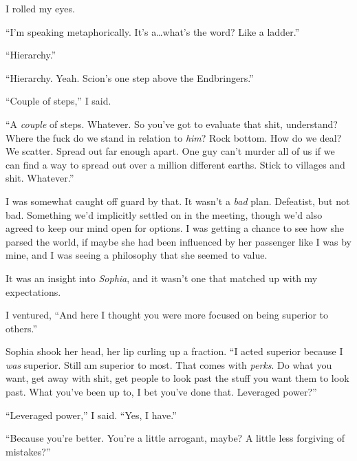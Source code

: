 I rolled my eyes.



``I'm speaking metaphorically.  It's a\ldots what's the word?  Like a ladder.''



``Hierarchy.''



``Hierarchy.  Yeah.  Scion's one step above the Endbringers.''



``Couple of steps,'' I said.



``A \emph{couple} of steps.  Whatever.  So you've got to evaluate that shit, understand?  Where the fuck do we stand in relation to \emph{him}?  Rock bottom.  How do we deal?  We scatter.  Spread out far enough apart.  One guy can't murder all of us if we can find a way to spread out over a million different earths.  Stick to villages and shit.  Whatever.''



I was somewhat caught off guard by that.  It wasn't a \emph{bad} plan.  Defeatist, but not bad.  Something we'd implicitly settled on in the meeting, though we'd also agreed to keep our mind open for options.  I was getting a chance to see how she parsed the world, if maybe she had been influenced by her passenger like I was by mine, and I was seeing a philosophy that she seemed to value.



It was an insight into \emph{Sophia}, and it wasn't one that matched up with my expectations.



I ventured, ``And here I thought you were more focused on being superior to others.''



Sophia shook her head, her lip curling up a fraction.  ``I acted superior because I \emph{was} superior.  Still am superior to most.  That comes with \emph{perks}.  Do what you want, get away with shit, get people to look past the stuff you want them to look past.  What you've been up to, I bet you've done that.  Leveraged power?''



``Leveraged power,'' I said.  ``Yes, I have.''



``Because you're better.  You're a little arrogant, maybe?  A little less forgiving of mistakes?''



